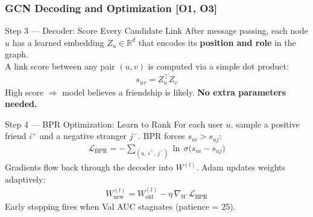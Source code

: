 \documentclass[10pt,aspectratio=43]{beamer}
\begin{document}
\begin{frame}
\frametitle{GCN Decoding and Optimization \textbf{[O1, O3]}}

\begin{exampleblock}{Step 3 --- Decoder: Score Every Candidate Link}
\small
After message passing, each node $u$ has a learned embedding $Z_u \in \mathbb{R}^{d}$ that encodes its \textbf{position and role} in the graph.\\[4pt]
A link score between any pair $(u, v)$ is computed via a simple \alert{dot product}:
\begin{align*}
  s_{uv} = Z_u^{\top} Z_v
\end{align*}
High score $\Rightarrow$ model believes a friendship is likely.
\textbf{No extra parameters needed.}
\end{exampleblock}

\vspace{0.25em}

\begin{alertblock}{Step 4 --- BPR Optimization: Learn to Rank}
\small
For each user $u$, sample a \alert{positive} friend $i^+$ and a \alert{negative} stranger $j^-$.
BPR forces $s_{ui} > s_{uj}$:
\begin{align*}
  \mathcal{L}_{\text{BPR}} = -\sum_{(u,\,i^+,\,j^-)} \ln\,\sigma\!\bigl(s_{ui} - s_{uj}\bigr)
\end{align*}
Gradients flow back through the decoder into $W^{(l)}$.
Adam updates weights adaptively:
\begin{align*}
  W^{(l)}_{\text{new}} = W^{(l)}_{\text{old}} - \eta\,\nabla_{W}\,\mathcal{L}_{\text{BPR}}
\end{align*}
Early stopping fires when Val AUC stagnates (patience = 25).
\end{alertblock}

\end{frame}
\end{document}

